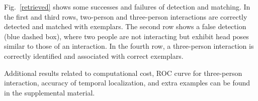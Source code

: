 Fig.~\ref{retrieved} shows some successes and failures of detection and matching. In the first and third rows,  two-person and three-person interactions are correctly detected and matched with exemplars. The second row shows a false detection (blue dashed box), where two people are not interacting but exhibit head poses similar to those of an interaction. In the fourth row, a three-person interaction is correctly identified and associated with correct exemplars.


Additional results related to computational cost, ROC curve for three-person interaction, accuracy of temporal localization, and extra examples can be found in the supplemental material.

